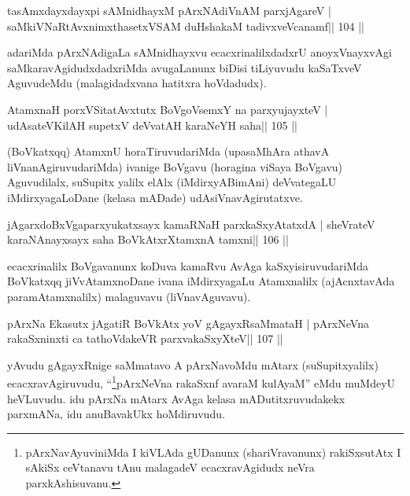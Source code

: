 \begin{shl}
tasAmxdayxdayxpi sAMnidhayxM pArxNAdiVnAM parxjAgareV |
saMkiVNaRtAvxnimxthasetxVSAM duHshakaM tadivxveVcanamf\hfill || 104 ||
\end{shl}

\begin{artha}
adariMda pArxNAdigaLa sAMnidhayxvu ecacxrinalilxdadxrU anoyxVnayxvAgi saMkaravAgidudxdadxriMda avugaLanunx biDisi tiLiyuvudu kaSaTxveV AguvudeMdu (malagidadxvana hatitxra hoVdadudx). 
\end{artha}


\begin{shl}
AtamxnaH porxVSitatAvxtutx BoVgoV\s semxY na parxyujayxteV |
udAsateV\s KilAH supetxV deVvatAH karaNeYH saha\hfill || 105 ||
\end{shl}

\begin{artha}
(BoVkatxqq) AtamxnU horaTiruvudariMda (upasaMhAra athavA liVnanAgiruvudariMda) ivanige BoVgavu (horagina viSaya BoVgavu) Aguvudilalx, suSupitx yalilx elAlx (iMdirxyABimAni) deVvategaLU iMdirxyagaLoDane (kelasa mADade) udAsiVnavAgirutatxve. 
\end{artha}


\begin{shl}
jAgarxdoBxVgaparxyukatxsayx kamaRNaH parxkaSxyAtatxdA |
sheVrateV karaNAnayxsayx saha BoVkAtxrX\s\s tamxnA \s\s tamxni\hfill || 106 ||
\end{shl}

\begin{artha}
ecacxrinalilx BoVgavanunx koDuva kamaRvu AvAga kaSxyisiruvudariMda  BoVkatxqq jiVvAtamxnoDane ivana iMdirxyagaLu Atamxnalilx (ajAcnxtavAda paramAtamxnalilx) malaguvavu (liVnavAguvavu).
\end{artha}

\begin{shl}
pArxNa Ekasutx jAgatiR BoVkAtx yoV gAgayxRsaMmataH |
pArxNeVna rakaSxninxti ca tathoVdakeVR parxvakaSxyXteV\hfill || 107 ||
\end{shl}

\begin{artha}
yAvudu gAgayxRnige saMmatavo A pArxNavoMdu mAtarx (suSupitxyalilx)  ecacxravAgiruvudu, ``\footnote{pArxNavAyuviniMda I kiVLAda gUDanunx  (shariVravanunx) rakiSxsutAtx I sAkiSx ceVtanavu tAnu malagadeV ecacxravAgidudx neVra parxkAshisuvanu.}pArxNeVna rakaSxnf avaraM kulAyaM'' eMdu muMdeyU heVLuvudu. idu pArxNa mAtarx AvAga kelasa mADutitxruvudakekx parxmANa, idu anuBavakUkx hoMdiruvudu.
\end{artha}

